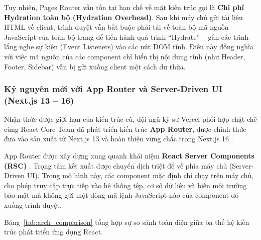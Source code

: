 \documentclass[12pt,a4paper]{extarticle}
\begin{document}
Tuy nhiên, Pages Router vẫn tồn tại hạn chế về mặt kiến trúc gọi là \textbf{Chi phí Hydration toàn bộ (Hydration Overhead)}. Sau khi máy chủ gửi tài liệu HTML về client, trình duyệt vẫn bắt buộc phải tải về toàn bộ mã nguồn JavaScript của toàn bộ trang để tiến hành quá trình ``Hydrate'' -- gắn các trình lắng nghe sự kiện (Event Listeners) vào các nút DOM tĩnh. Điều này đồng nghĩa với việc mã nguồn của các component chỉ hiển thị nội dung tĩnh (như Header, Footer, Sidebar) vẫn bị gửi xuống client một cách dư thừa.

\subsubsection{Kỷ nguyên mới với App Router và Server-Driven UI (Next.js 13 -- 16)}
Nhận thức được giới hạn của kiến trúc cũ, đội ngũ kỹ sư Vercel phối hợp chặt chẽ cùng React Core Team đã phát triển kiến trúc \textbf{App Router}, được chính thức đưa vào sản xuất từ Next.js 13 và hoàn thiện vững chắc trong Next.js 16 \cite{nextjs_docs}.

App Router được xây dựng xung quanh khái niệm \textbf{React Server Components (RSC)} \cite{rsc_architecture}. Trọng tâm kết xuất được chuyển dịch triệt để về phía máy chủ (Server-Driven UI). Trong mô hình này, các component mặc định chỉ chạy trên máy chủ, cho phép truy cập trực tiếp vào hệ thống tệp, cơ sở dữ liệu và biến môi trường bảo mật mà không gửi một dòng mã lệnh JavaScript nào của component đó xuống trình duyệt.

Bảng~\ref{tab:arch_comparison} tổng hợp sự so sánh toàn diện giữa ba thế hệ kiến trúc phát triển ứng dụng React.
\end{document}
